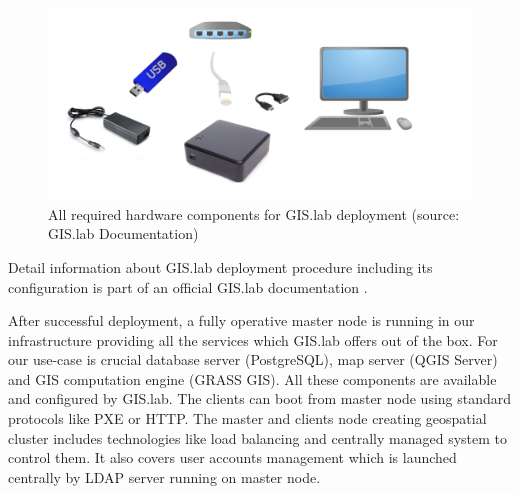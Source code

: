 \documentclass{isprs}
\begin{document}
\begin{figure}[ht!]
\begin{center}
  \includegraphics[width=1.0\columnwidth]{figures/installation-unit.png}
  \caption{All required hardware components for GIS.lab deployment
    (source: GIS.lab Documentation)}
\label{fig:gislab_infrastructure}
\end{center}
\end{figure}

Detail information about GIS.lab deployment procedure including its
configuration is part of an official GIS.lab documentation
\cite{gislab-docs}.

After successful deployment, a fully operative master node is running
in our infrastructure providing all the services which GIS.lab offers
out of the box. For our use-case is crucial database server
(PostgreSQL), map server (QGIS Server) and GIS computation engine
(GRASS GIS). All these components are available and configured by
GIS.lab. The clients can boot from master node using standard
protocols like PXE or HTTP. The master and clients node creating
geospatial cluster includes technologies like load balancing and
centrally managed system to control them. It also covers user accounts
management which is launched centrally by LDAP server running on
master node.
\end{document}
